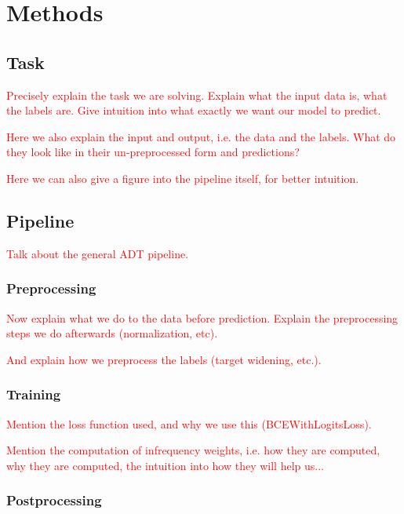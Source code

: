 \chapter{Methods}

\section{Task}

\textcolor{red}{Precisely explain the task we are solving. Explain what the input data is, what the labels are.
Give intuition into what exactly we want our model to predict.}

\textcolor{red}{Here we also explain the input and output, i.e. the data and the labels.
What do they look like in their un-preprocessed form and predictions?}

\textcolor{red}{Here we can also give a figure into the pipeline itself, for better intuition.}

\section{Pipeline}

\textcolor{red}{Talk about the general \gls{ADT} pipeline.}

\subsection{Preprocessing}

\textcolor{red}{Now explain what we do to the data before prediction. Explain the preprocessing steps we do afterwards (normalization, etc).}

\textcolor{red}{And explain how we preprocess the labels (target widening, etc.).}

\subsection{Training}

\textcolor{red}{Mention the loss function used, and why we use this (BCEWithLogitsLoss).}

\textcolor{red}{Mention the computation of infrequency weights, i.e. how they are computed, why they are computed, the intuition into how they will help us...}

\subsection{Postprocessing}

